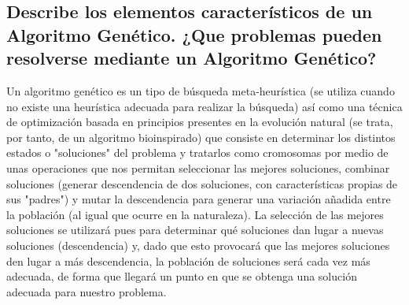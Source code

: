 \documentclass[a4paper, 11pt]{article}
\begin{document}
\subsection{Describe los elementos característicos de un Algoritmo Genético. ¿Que problemas pueden resolverse mediante un Algoritmo Genético?}
Un algoritmo genético es un tipo de búsqueda meta-heurística (se utiliza cuando no existe una heurística adecuada para realizar la búsqueda) así como una técnica de optimización basada en principios presentes en la evolución natural (se trata, por tanto, de un algoritmo bioinspirado) que consiste en determinar los distintos estados o "soluciones" del problema y tratarlos como cromosomas por medio de unas operaciones que nos permitan seleccionar las mejores soluciones, combinar soluciones (generar descendencia de dos soluciones, con características propias de sus "padres") y mutar la descendencia para generar una variación añadida entre la población (al igual que ocurre en la naturaleza). La selección de las mejores soluciones se utilizará pues para determinar qué soluciones dan lugar a nuevas soluciones (descendencia) y, dado que esto provocará que las mejores soluciones den lugar a más descendencia, la población de soluciones será cada vez más adecuada, de forma que llegará un punto en que se obtenga una solución adecuada para nuestro problema.
\end{document}
